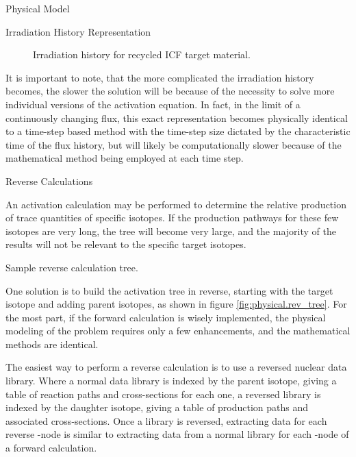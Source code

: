 \begin{chapter}{Physical Model\label{chap:physical}}
\begin{section}{Irradiation History Representation\label{sec:physical.pulsing}}
  \begin{figure}[htbp]
    \begin{center}
      \leavevmode
      \caption{Irradiation history for recycled ICF target material.}
      \label{fig:physical.highZ_recycle_hist}
    \end{center}
  \end{figure}
  
  It is important to note, that the more complicated the irradiation
  history becomes, the slower the solution will be because of the
  necessity to solve more individual versions of the activation
  equation.  In fact, in the limit of a continuously changing flux,
  this exact representation becomes physically identical to a
  time-step based method with the time-step size dictated by the
  characteristic time of the flux history, but will likely be
  computationally slower because of the mathematical method being
  employed at each time step.
\end{section}


\begin{section}{Reverse Calculations\label{sec:physical.reverse}}
  
  An activation calculation may be performed to determine the relative
  production of trace quantities of specific isotopes.  If the
  production pathways for these few isotopes are very long, the tree
  will become very large, and the majority of the results will not be
  relevant to the specific target isotopes.
  
  \begin{floatingfigure}{0.55\columnwidth}
    \begin{center}
      \caption{Sample reverse calculation tree.}\label{fig:physical.rev_tree}
    \end{center}
  \end{floatingfigure}

  One solution is to build the activation tree in reverse, starting
  with the target isotope and adding parent isotopes, as shown in
  figure \ref{fig:physical.rev_tree}.  For the most part, if the
  forward calculation is wisely implemented, the physical modeling of
  the problem requires only a few enhancements, and the mathematical
  methods are identical.
  
  The easiest way to perform a reverse calculation is to use a
  reversed nuclear data library.  Where a normal data library is
  indexed by the parent isotope, giving a table of reaction paths and
  cross-sections for each one, a reversed library is indexed by the
  daughter isotope, giving a table of production paths and associated
  cross-sections.  Once a library is reversed, extracting data for
  each reverse \pc-node is similar to extracting data from a normal
  library for each \pc-node of a forward calculation.
  

\end{section}
\end{chapter}
